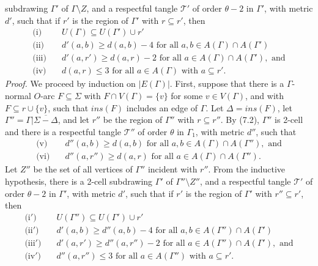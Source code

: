 \noindent subdrawing $\Gamma'$ of $\Gamma \setminus Z$, and a respectful tangle $\mathscr{T}'$ of order $\theta - 2$ in $\Gamma'$, with metric $d'$, such that if $r'$ is the region of $\Gamma'$ with $r \subseteq r'$, then
\begin{align*}
\text{(i)} \quad & U(\Gamma) \subseteq U(\Gamma') \cup r' \\
\text{(ii)} \quad & d'(a, b) \ge d(a, b) - 4 \text{ for all } a, b \in A(\Gamma) \cap A(\Gamma') \\
\text{(iii)} \quad & d'(a, r') \ge d(a, r) - 2 \text{ for all } a \in A(\Gamma) \cap A(\Gamma'), \text{ and} \\
\text{(iv)} \quad & d(a, r) \le 3 \text{ for all } a \in A(\Gamma) \text{ with } a \subseteq r'.
\end{align*}
\textit{Proof.} We proceed by induction on $|E(\Gamma)|$. First, suppose that there is a $\Gamma$-normal $O$-arc $F \subseteq \Sigma$ with $F \cap V(\Gamma) = \{v\}$ for some $v \in V(\Gamma)$, and with $F \subseteq r \cup \{v\}$, such that $ins(F)$ includes an edge of $\Gamma$. Let $\Delta = ins(F)$, let $\Gamma'' = \Gamma | \overline{\Sigma - \Delta}$, and let $r''$ be the region of $\Gamma''$ with $r \subseteq r''$. By (7.2), $\Gamma''$ is 2-cell and there is a respectful tangle $\mathscr{T}''$ of order $\theta$ in $\Gamma_1$, with metric $d''$, such that
\begin{align*}
\text{(v)} \quad & d''(a, b) \ge d(a, b) \text{ for all } a, b \in A(\Gamma) \cap A(\Gamma''), \text{ and} \\
\text{(vi)} \quad & d''(a, r'') \ge d(a, r) \text{ for all } a \in A(\Gamma) \cap A(\Gamma'').
\end{align*}
Let $Z''$ be the set of all vertices of $\Gamma''$ incident with $r''$. From the inductive hypothesis, there is a 2-cell subdrawing $\Gamma'$ of $\Gamma'' \setminus Z''$, and a respectful tangle $\mathscr{T}'$ of order $\theta - 2$ in $\Gamma'$, with metric $d'$, such that if $r'$ is the region of $\Gamma'$ with $r'' \subseteq r'$, then
\begin{align*}
\text{(i$'$)} \quad & U(\Gamma'') \subseteq U(\Gamma') \cup r' \\
\text{(ii$'$)} \quad & d'(a, b) \ge d''(a, b) - 4 \text{ for all } a, b \in A(\Gamma'') \cap A(\Gamma') \\
\text{(iii$'$)} \quad & d'(a, r') \ge d''(a, r'') - 2 \text{ for all } a \in A(\Gamma'') \cap A(\Gamma'), \text{ and} \\
\text{(iv$'$)} \quad & d''(a, r'') \le 3 \text{ for all } a \in A(\Gamma'') \text{ with } a \subseteq r'.
\end{align*}
